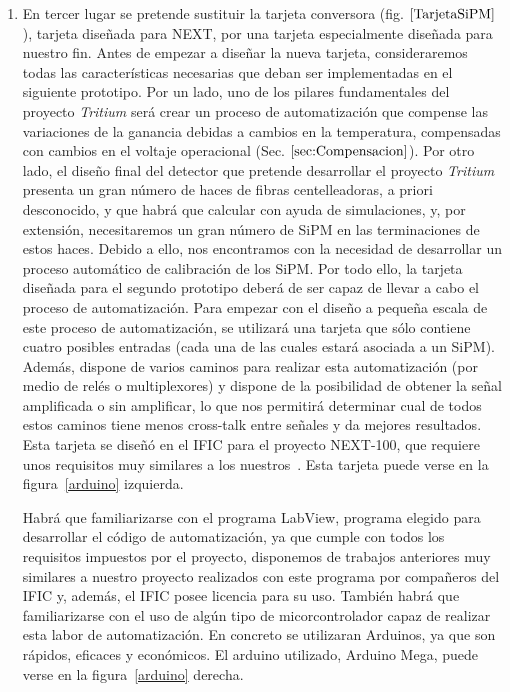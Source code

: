 \begin{enumerate}
\item{} En tercer lugar se pretende sustituir la tarjeta conversora (fig. $\ref{TarjetaSiPM}$), tarjeta diseñada para NEXT, por una tarjeta especialmente diseñada para nuestro fin. Antes de empezar a diseñar la nueva tarjeta,  consideraremos todas las características necesarias que deban  ser implementadas  en el siguiente prototipo.
Por un lado, uno de los pilares fundamentales del proyecto \textit{Tritium} será crear un proceso de automatización que compense las variaciones de la ganancia debidas a cambios en la temperatura, compensadas con cambios en el voltaje operacional (Sec. $\ref{sec:Compensacion}$).
Por otro lado, el diseño final del detector que pretende desarrollar el proyecto \textit{Tritium} presenta un gran número de haces de fibras centelleadoras, a priori  desconocido, y que habrá que calcular con ayuda de simulaciones, y, por extensión, necesitaremos un gran número de SiPM en las terminaciones de estos haces. Debido a ello, nos encontramos con la necesidad de desarrollar un proceso automático de calibración de los SiPM.  
Por todo ello, la tarjeta diseñada para el segundo prototipo deberá de ser capaz de llevar a cabo el proceso  de automatización. 
Para empezar con el diseño a pequeña escala de este proceso de automatización, se utilizará una tarjeta que sólo contiene cuatro posibles entradas (cada una de las cuales estará asociada a un SiPM). Además, dispone de varios caminos para realizar esta automatización (por medio de relés o multiplexores) y dispone de la posibilidad de obtener la señal amplificada o sin amplificar, lo que nos permitirá determinar cual de todos estos caminos tiene menos cross-talk entre señales y da mejores resultados. Esta tarjeta  se diseñó en el IFIC para el proyecto NEXT-100, que requiere unos requisitos muy similares a los nuestros~\cite{Marc}. Esta tarjeta puede verse en la figura~\ref{arduino} izquierda.

Habrá que familiarizarse con el programa LabView, programa elegido para desarrollar el código de automatización, ya que cumple con todos los requisitos impuestos por el proyecto, disponemos de trabajos anteriores muy similares a nuestro proyecto realizados con este programa por compañeros del IFIC y, además, el IFIC posee licencia para su uso. También habrá que familiarizarse con el uso de algún tipo de micorcontrolador capaz de realizar esta labor de automatización. En concreto se utilizaran Arduinos, ya que son rápidos, eficaces y económicos. El arduino utilizado, Arduino Mega, puede verse  en la figura~\ref{arduino}  derecha.


\end{enumerate}
